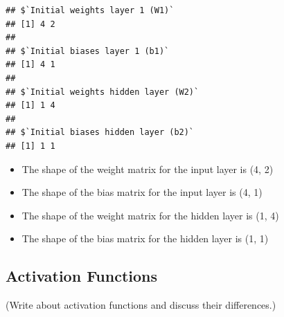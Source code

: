 \begin{verbatim}
## $`Initial weights layer 1 (W1)`
## [1] 4 2
## 
## $`Initial biases layer 1 (b1)`
## [1] 4 1
## 
## $`Initial weights hidden layer (W2)`
## [1] 1 4
## 
## $`Initial biases hidden layer (b2)`
## [1] 1 1
\end{verbatim}

\begin{itemize}
\tightlist
\item
  The shape of the weight matrix for the input layer is (4, 2)
\item
  The shape of the bias matrix for the input layer is (4, 1)
\item
  The shape of the weight matrix for the hidden layer is (1, 4)
\item
  The shape of the bias matrix for the hidden layer is (1, 1)
\end{itemize}

\hypertarget{activation-functions}{%
\subsection{Activation Functions}\label{activation-functions}}

(Write about activation functions and discuss their differences.)

